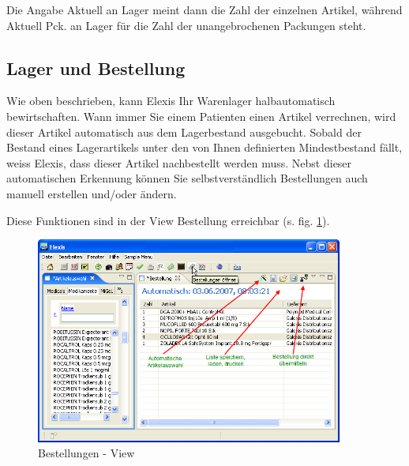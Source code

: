 Die Angabe \glqq Aktuell an Lager\grqq{} meint dann die Zahl der einzelnen
Artikel, während \glqq Aktuell Pck. an Lager\grqq{} für die Zahl der
unangebrochenen Packungen steht.


\subsection{Lager und Bestellung}
Wie oben beschrieben, kann Elexis Ihr Warenlager halbautomatisch bewirtschaften.
Wann immer Sie einem Patienten einen Artikel verrechnen, wird dieser Artikel
automatisch aus dem Lagerbestand ausgebucht. Sobald der Bestand eines
Lagerartikels unter den von Ihnen definierten Mindestbestand fällt, \glqq
weiss\grqq{} Elexis, dass dieser Artikel nachbestellt werden muss. Nebst dieser
automatischen Erkennung können Sie selbstverständlich Bestellungen auch manuell
erstellen und/oder ändern.

Diese Funktionen sind in der View \glqq Bestellung\grqq{} erreichbar (s. fig.
\ref{fig:bestellungen}).
\begin{figure}[htp]
\begin{center}
  \includegraphics[width=0.9\textwidth]{images/bestell1}
  \caption{Bestellungen - View}
  \label{fig:bestellungen}
\end{center}
\end{figure}


